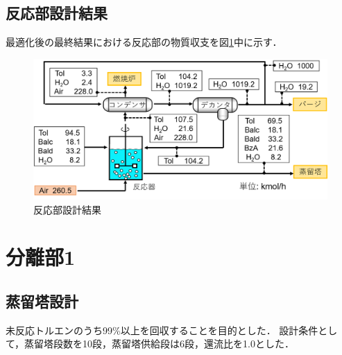 \section{反応部設計結果}
最適化後の最終結果における反応部の物質収支を図\ref{反応部設計結果の図}中に示す．
\begin{figure}[htbp]
    \label{反応部設計結果の図}
    \begin{center}
        \includegraphics[scale=0.7]{ReactionSectionConclusion.png}
        \caption{反応部設計結果}
    \end{center}
\end{figure}


\newpage
\chapter{分離部1}
\section{蒸留塔設計}
未反応トルエンのうち99\%以上を回収することを目的とした．
設計条件として，蒸留塔段数を10段，蒸留塔供給段は6段，還流比を1.0とした．

